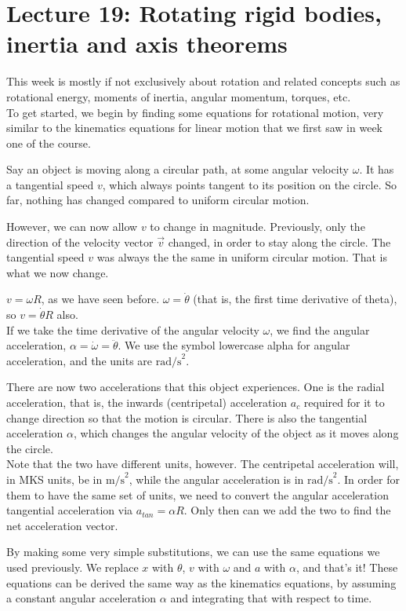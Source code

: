 
\section{Lecture 19: Rotating rigid bodies, inertia and axis theorems}

This week is mostly if not exclusively about rotation and related concepts such as rotational energy, moments of inertia, angular momentum, torques, etc.\\
To get started, we begin by finding some equations for rotational motion, very similar to the kinematics equations for linear motion that we first saw in week one of the course.

Say an object is moving along a circular path, at some angular velocity $\omega$. It has a tangential speed $v$, which always points tangent to its position on the circle. So far, nothing has changed compared to uniform circular motion.

However, we can now allow $v$ to change in magnitude. Previously, only the direction of the velocity vector $\vec{v}$ changed, in order to stay along the circle. The tangential speed $v$ was always the the same in uniform circular motion. That is what we now change.

$v = \omega R$, as we have seen before. $\omega = \dot{\theta}$ (that is, the first time derivative of theta), so $v = \dot{\theta} R$ also.\\
If we take the time derivative of the angular velocity $\omega$, we find the angular acceleration, $\alpha = \dot{\omega} = \ddot{\theta}$. We use the symbol lowercase alpha for angular acceleration, and the units are $\text{rad/s}^2$.

There are now two accelerations that this object experiences. One is the radial acceleration, that is, the inwards (centripetal) acceleration $a_c$ required for it to change direction so that the motion is circular. There is also the tangential acceleration $\alpha$, which changes the angular velocity of the object as it moves along the circle.\\
Note that the two have different units, however. The centripetal acceleration will, in MKS units, be in $\text{m/s}^2$, while the angular acceleration is in $\text{rad/s}^2$. In order for them to have the same set of units, we need to convert the angular acceleration tangential acceleration via $a_{tan} = \alpha R$. Only then can we add the two to find the net acceleration vector.

By making some very simple substitutions, we can use the same equations we used previously. We replace $x$ with $\theta$, $v$ with $\omega$ and $a$ with $\alpha$, and that's it! These equations can be derived the same way as the kinematics equations, by assuming a constant angular acceleration $\alpha$ and integrating that with respect to time.

